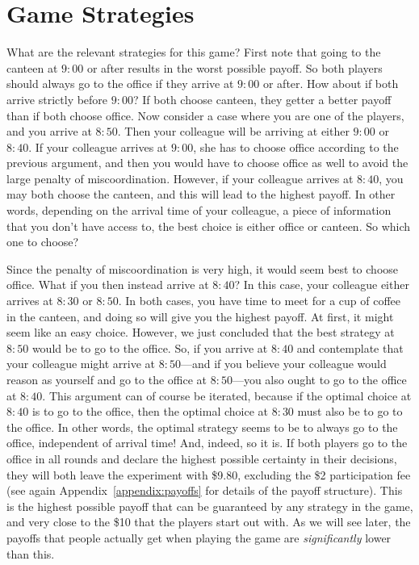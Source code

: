 \documentclass[twocolumn,a4paper,superscriptaddress,nofootinbib]{revtex4}
\begin{document}
\section{Game Strategies}
What are the relevant strategies for this game? First note that going to the canteen at $9{:}00$ or after results in the worst possible payoff. So both players should always go to the office if they arrive at $9{:}00$ or after. How about if both arrive strictly before $9{:}00$? If both choose canteen, they getter a better payoff than if both choose office. Now consider a case where you are one of the players, and you arrive at $8{:}50$. Then your colleague will be arriving at either $9{:}00$ or $8{:}40$. If your colleague arrives at $9{:}00$, she has to choose office according to the previous argument, and then you would have to choose office as well to avoid the large penalty of miscoordination. However, if your colleague arrives at $8{:}40$, you may both choose the canteen, and this will lead to the highest payoff. In other words, depending on the arrival time of your colleague, a piece of information that you don't have access to, the best choice is either office or canteen. So which one to choose?

Since the penalty of miscoordination is very high, it would seem best to choose office. What if you then instead  arrive at $8{:}40$? In this case, your colleague either arrives at $8{:}30$ or $8{:}50$. In both cases, you have time to meet for a cup of coffee in the canteen, and doing so will give you the highest payoff. At first, it might seem like an easy choice. However, we just concluded that the best strategy at $8{:}50$ would be to go to the office. So, if you arrive at $8{:}40$ and contemplate that your colleague might arrive at $8{:}50$---and if you believe your colleague would reason as yourself and go to the office at $8{:}50$---you also ought to go to the office at $8{:}40$. This argument can of course be iterated, because if the optimal choice at $8{:}40$ is to go to the office, then the optimal choice at $8{:}30$ must also be to go to the office. In other words, the optimal strategy seems to be to always go to the office, independent of arrival time! And, indeed, so it is. If both players go to the office in all rounds and declare the highest possible certainty in their decisions, they will both leave the experiment with \$9.80, excluding the \$2 participation fee (see again Appendix~\ref{appendix:payoffs} for details of the payoff structure). This is the highest possible payoff that can be guaranteed by any strategy in the game, and very close to the \$10 that the players start out with. As we will see later, the payoffs that people actually get when playing the game are \emph{significantly} lower than this.
\end{document}
